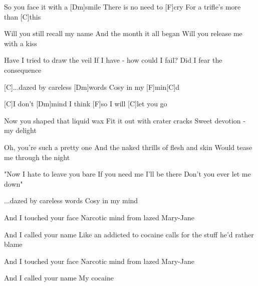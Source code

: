 \bcol
[C]So you face it with a [Dm]smile                                
There is no need to [F]cry
For a trifle's more than [C]this

Will you still recall my name
And the month it all began
Will you release me with a kiss

Have I tried to draw the veil
If I have - how could I fail?
Did I fear the consequence

[C]...dazed by careless [Dm]words         
Cosy in my [F]min[C]d 

[C]I don't [Dm]mind            
I think [F]so         
I will [C]let you go

Now you shaped that liquid wax
Fit it out with crater cracks
Sweet devotion - my delight

Oh, you're such a pretty one
And the naked thrills of flesh and skin
Would tease me through the night

\ncol
"Now I hate to leave you bare
If you need me I'll be there
Don't you ever let me down"

...dazed by careless words
Cosy in my mind


And I touched your face
Narcotic mind from lazed Mary-Jane

And I called your name
Like an addicted to cocaine calls for
the stuff he'd rather blame

And I touched your face
Narcotic mind from lazed Mary-Jane

And I called your name
My cocaine
\ecol


